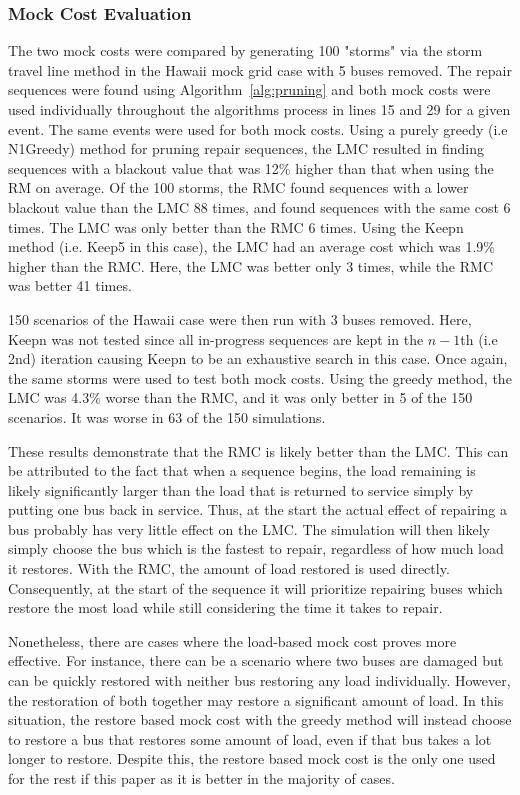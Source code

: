 \documentclass[12pt]{article}
\begin{document}
\subsubsection{Mock Cost Evaluation} \label{MCostEval}
The two mock costs were compared by generating 100 "storms" via the storm travel line method in the Hawaii mock grid case with 5 buses removed. The repair sequences were found using Algorithm~\ref{alg:pruning} and both mock costs were used individually throughout the algorithms process in lines 15 and 29 for a given event. The same events were used for both mock costs. Using a purely greedy (i.e N1Greedy) method for pruning repair sequences, the LMC resulted in finding sequences with a blackout value that was 12\% higher than that when using the RM on average. Of the 100 storms, the RMC found sequences with a lower blackout value than the LMC 88 times, and found sequences with the same cost 6 times. The LMC was only better than the RMC 6 times. Using the Keepn method (i.e. Keep5 in this case), the LMC had an average cost which was 1.9\% higher than the RMC. Here, the LMC was better only 3 times, while the RMC was better 41 times. \par
150 scenarios of the Hawaii case were then run with 3 buses removed. Here, Keepn was not tested since all in-progress sequences are kept in the $n-1$th (i.e 2nd) iteration causing Keepn to be an exhaustive search in this case. Once again, the same storms were used to test both mock costs. Using the greedy method, the LMC was 4.3\% worse than the RMC, and it was only better in 5 of the 150 scenarios. It was worse in 63 of the 150 simulations. \par
These results demonstrate that the RMC is likely better than the LMC. This can be attributed to the fact that when a sequence begins, the load remaining is likely significantly larger than the load that is returned to service simply by putting one bus back in service. Thus, at the start the actual effect of repairing a bus probably has very little effect on the LMC. The simulation will then likely simply choose the bus which is the fastest to repair, regardless of how much load it restores. With the RMC, the amount of load restored is used directly. Consequently, at the start of the sequence it will prioritize repairing buses which restore the most load while still considering the time it takes to repair. \par
Nonetheless, there are cases where the load-based mock cost proves more effective. For instance, there can be a scenario where two buses are damaged but can be quickly restored with neither bus restoring any load individually. However, the restoration of both together may restore a significant amount of load. In this situation, the restore based mock cost with the greedy method will instead choose to restore a bus that restores some amount of load, even if that bus takes a lot longer to restore. Despite this, the restore based mock cost is the only one used for the rest if this paper as it is better in the majority of cases.
\end{document}
